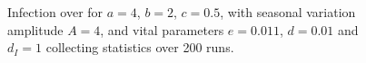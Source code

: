 \begin{figure}[H]
    \centering
    \caption{Infection over for $a=4$, $b=2$, $c=0.5$, with seasonal variation amplitude $A = 4$, and vital parameters $e=0.011$, $d=0.01$ and $d_I=1$ collecting statistics over 200 runs.}
    \label{fig:seasonalI_over}
\end{figure}




